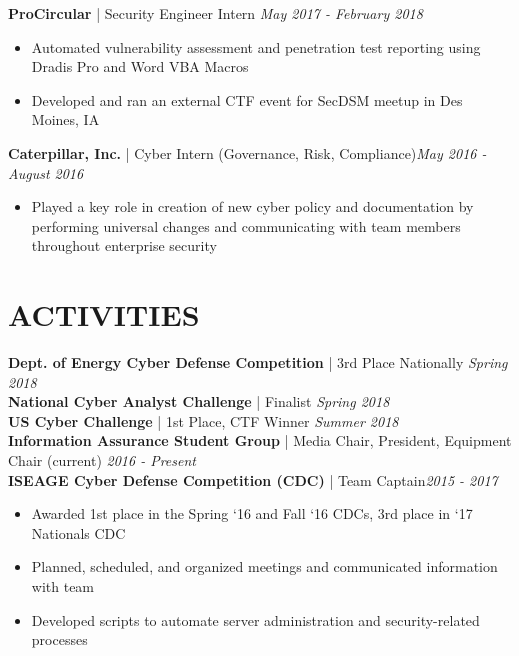 \documentclass[line]{res}
\begin{document}
\begin{resume}
\begin{itemize}
\end{itemize}

\textbf{ProCircular} | Security Engineer Intern \hfill \textit{May 2017 - February 2018}
\begin{itemize}
	\item Automated vulnerability assessment and penetration test reporting using Dradis Pro and Word VBA Macros
	\item Developed and ran an external CTF event for SecDSM meetup in Des Moines, IA
\end{itemize}

\textbf{Caterpillar, Inc.} | Cyber Intern (Governance, Risk, Compliance)\hfill \textit{May 2016 - August 2016}
\begin{itemize}
	\item Played a key role in creation of new cyber policy and documentation by performing universal changes and communicating with team members throughout enterprise security
\end{itemize}

\section{ACTIVITIES}
\textbf{Dept. of Energy Cyber Defense Competition} | 3rd Place Nationally \hfill \textit{Spring 2018}\\
\textbf{National Cyber Analyst Challenge} | Finalist \hfill \textit{Spring 2018}\\
\textbf{US Cyber Challenge} | 1st Place, CTF Winner \hfill \textit{Summer 2018}\\
\textbf{Information Assurance Student Group} | Media Chair, President, Equipment Chair (current) \hfill \textit{2016 - Present}\\
\textbf{ISEAGE Cyber Defense Competition (CDC)} | Team Captain\hfill \textit{2015 - 2017}
\begin{itemize}
	\item Awarded 1st place in the Spring ‘16 and Fall ‘16 CDCs, 3rd place in ‘17 Nationals CDC
	\item Planned, scheduled, and organized meetings and communicated information with team
	\item Developed scripts to automate server administration and security-related processes
\end{itemize}


\end{resume}
\end{document}
